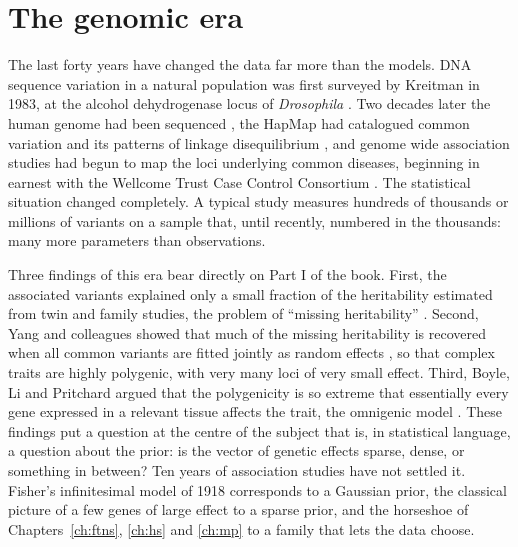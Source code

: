 \section{The genomic era}

The last forty years have changed the data far more than the models. DNA sequence variation in a
natural population was first surveyed by Kreitman in 1983, at the alcohol dehydrogenase locus of
\emph{Drosophila} \citep{intro:kreitman1983}. Two decades later the human genome had been sequenced
\citep{intro:ihgsc2001}, the HapMap had catalogued common variation and its patterns of linkage
disequilibrium \citep{intro:hapmap2005}, and genome wide association studies had begun to map the
loci underlying common diseases, beginning in earnest with the Wellcome Trust Case Control
Consortium \citep{intro:wtccc2007}. The statistical situation changed completely. A typical study
measures hundreds of thousands or millions of variants on a sample that, until recently, numbered
in the thousands: many more parameters than observations.

Three findings of this era bear directly on Part I of the book. First, the associated variants
explained only a small fraction of the heritability estimated from twin and family studies, the
problem of ``missing heritability'' \citep{intro:manolio2009}. Second, Yang and colleagues showed
that much of the missing heritability is recovered when all common variants are fitted jointly
as random effects \citep{intro:yang2010}, so that complex traits are highly polygenic, with very
many loci of very small effect. Third, Boyle, Li and Pritchard argued that the polygenicity is so
extreme that essentially every gene expressed in a relevant tissue affects the trait, the
omnigenic model \citep{intro:boyle2017}. These findings put a question at the centre of the
subject that is, in statistical language, a question about the prior: is the vector of genetic
effects sparse, dense, or something in between? Ten years of association studies
\citep{intro:visscher2017} have not settled it. Fisher's infinitesimal model of 1918 corresponds to
a Gaussian prior, the classical picture of a few genes of large effect to a sparse prior, and the
horseshoe of Chapters~\ref{ch:ftns}, \ref{ch:hs} and \ref{ch:mp} to a family that lets the data
choose.

